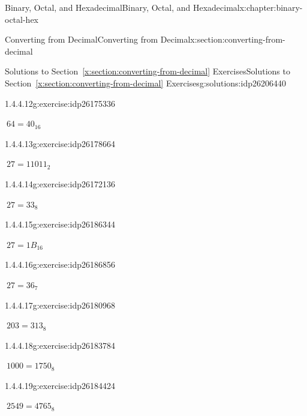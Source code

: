 \documentclass[twoside,10pt,]{book}
\newcommand{\xreffont}{\relax}
\numberwithin{equation}{section}
\begin{document}
\begin{chapterptx}{Binary, Octal, and Hexadecimal}{}{Binary, Octal, and Hexadecimal}{}{}{x:chapter:binary-octal-hex}
\begin{sectionptx}{Converting from Decimal}{}{Converting from Decimal}{}{}{x:section:converting-from-decimal}
\begin{solutions-subsection}{Solutions to Section~{\xreffont\ref*{x:section:converting-from-decimal}} Exercises}{}{Solutions to Section~{\xreffont\ref*{x:section:converting-from-decimal}} Exercises}{}{}{g:solutions:idp26206440}
\begin{exercisegroup}
\begin{divisionsolutioneg}{1.4.4.12}{}{g:exercise:idp26175336}
\par\smallskip%
\noindent\hypertarget{g:solution:idp26172648-main}{}\(\ 64=40_{16}\)\end{divisionsolutioneg}%
\end{exercisegroup}
\par\medskip\noindent
\begin{exercisegroup}
\begin{divisionsolutioneg}{1.4.4.13}{}{g:exercise:idp26178664}%
\par\smallskip%
\noindent\hypertarget{g:solution:idp26179432-main}{}\(\ 27=11011_2\)\end{divisionsolutioneg}%
\begin{divisionsolutioneg}{1.4.4.14}{}{g:exercise:idp26172136}%
\par\smallskip%
\noindent\hypertarget{g:solution:idp26182760-main}{}\(\ 27=33_8\)\end{divisionsolutioneg}%
\begin{divisionsolutioneg}{1.4.4.15}{}{g:exercise:idp26186344}%
\par\smallskip%
\noindent\hypertarget{g:solution:idp26183400-main}{}\(\ 27=1B_{16}\)\end{divisionsolutioneg}%
\begin{divisionsolutioneg}{1.4.4.16}{}{g:exercise:idp26186856}%
\par\smallskip%
\noindent\hypertarget{g:solution:idp26182632-main}{}\(\ 27=36_7\)\end{divisionsolutioneg}%
\end{exercisegroup}
\par\medskip\noindent
\begin{exercisegroup}
\begin{divisionsolutioneg}{1.4.4.17}{}{g:exercise:idp26180968}%
\par\smallskip%
\noindent\hypertarget{g:solution:idp26183656-main}{}\(\ 203=313_8\)\end{divisionsolutioneg}%
\begin{divisionsolutioneg}{1.4.4.18}{}{g:exercise:idp26183784}%
\par\smallskip%
\noindent\hypertarget{g:solution:idp26186984-main}{}\(\ 1000=1750_8\)\end{divisionsolutioneg}%
\begin{divisionsolutioneg}{1.4.4.19}{}{g:exercise:idp26184424}%
\par\smallskip%
\noindent\hypertarget{g:solution:idp26186600-main}{}\(\ 2549=4765_8\)\end{divisionsolutioneg}%

\end{exercisegroup}
\end{solutions-subsection}
\end{sectionptx}
\end{chapterptx}
\end{document}
